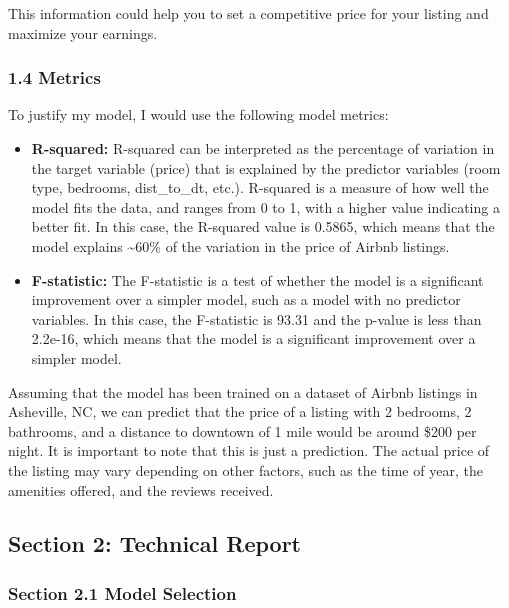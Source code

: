 \documentclass[
  letterpaper,
  DIV=11,
  numbers=noendperiod]{scrartcl}
\begin{document}
This information could help you to set a competitive price for your
listing and maximize your earnings.

\hypertarget{metrics}{%
\subsubsection{1.4 Metrics}\label{metrics}}

To justify my model, I would use the following model metrics:

\begin{itemize}
\item
  \textbf{R-squared:} R-squared can be interpreted as the percentage of
  variation in the target variable (price) that is explained by the
  predictor variables (room type, bedrooms, dist\_to\_dt, etc.).
  R-squared is a measure of how well the model fits the data, and ranges
  from 0 to 1, with a higher value indicating a better fit. In this
  case, the R-squared value is 0.5865, which means that the model
  explains \textasciitilde60\% of the variation in the price of Airbnb
  listings.
\item
  \textbf{F-statistic:} The F-statistic is a test of whether the model
  is a significant improvement over a simpler model, such as a model
  with no predictor variables. In this case, the F-statistic is 93.31
  and the p-value is less than 2.2e-16, which means that the model is a
  significant improvement over a simpler model.
\end{itemize}

Assuming that the model has been trained on a dataset of Airbnb listings
in Asheville, NC, we can predict that the price of a listing with 2
bedrooms, 2 bathrooms, and a distance to downtown of 1 mile would be
around \$200 per night. It is important to note that this is just a
prediction. The actual price of the listing may vary depending on other
factors, such as the time of year, the amenities offered, and the
reviews received.

\hypertarget{section-2-technical-report}{%
\subsection{Section 2: Technical
Report}\label{section-2-technical-report}}

\hypertarget{section-2.1-model-selection}{%
\subsubsection{Section 2.1 Model
Selection}\label{section-2.1-model-selection}}
\end{document}
